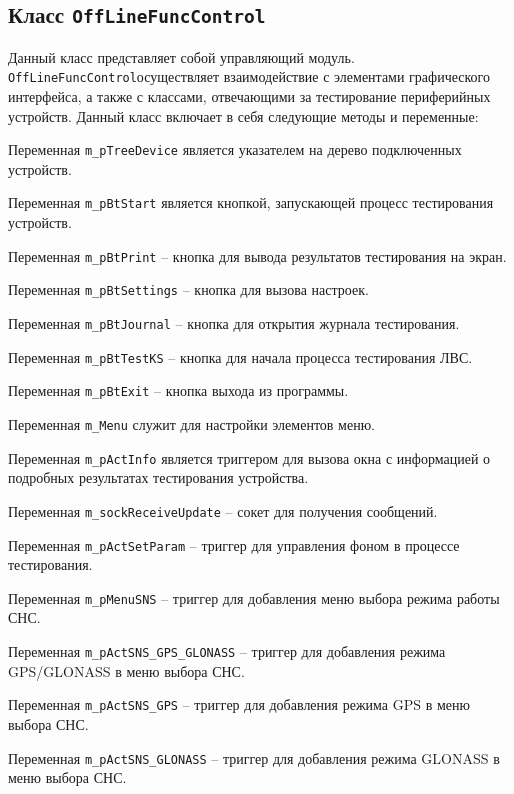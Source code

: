 \subsection{Класс \texttt{OffLineFuncControl}}
Данный класс представляет собой управляющий модуль. \texttt{OffLineFuncControl}осуществляет взаимодействие с элементами графического
интерфейса, а также с классами, отвечающими за тестирование периферийных устройств.
Данный класс включает в себя следующие методы и переменные:
\begin{enum}
	\item Переменная \texttt{m\_pTreeDevice} является указателем на дерево подключенных устройств.
	\item Переменная \texttt{m\_pBtStart} является кнопкой, запускающей процесс тестирования устройств.
	\item Переменная \texttt{m\_pBtPrint} -- кнопка для вывода результатов тестирования на экран.
	\item Переменная \texttt{m\_pBtSettings} -- кнопка для вызова настроек.
	\item Переменная \texttt{m\_pBtJournal} -- кнопка для открытия журнала тестирования.
	\item Переменная \texttt{m\_pBtTestKS} -- кнопка для начала процесса тестирования ЛВС.
	\item Переменная \texttt{m\_pBtExit} -- кнопка выхода из программы.

	\item Переменная \texttt{m\_Menu} служит для настройки элементов меню.
	\item Переменная \texttt{m\_pActInfo} является триггером для вызова окна с информацией о подробных результатах
		тестирования устройства.

	\item Переменная \texttt{m\_sockReceiveUpdate} -- сокет для получения сообщений.

	\item Переменная \texttt{m\_pActSetParam} -- триггер для управления фоном в процессе тестирования.
	\item Переменная \texttt{m\_pMenuSNS} -- триггер для добавления меню выбора режима работы СНС.
	\item Переменная \texttt{m\_pActSNS\_GPS\_GLONASS} -- триггер для добавления режима GPS/GLONASS в меню выбора
		СНС.
	\item Переменная \texttt{m\_pActSNS\_GPS} -- триггер для добавления режима GPS в меню выбора СНС.
	\item Переменная \texttt{m\_pActSNS\_GLONASS} -- триггер для добавления режима GLONASS в меню выбора СНС.


\end{enum}
